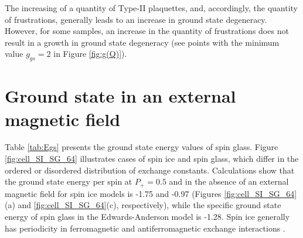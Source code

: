 \documentclass[preprint,12pt]{elsarticle}
\begin{document}
	The increasing of a quantity of Type-II plaquettes, and, accordingly, the quantity of frustrations, generally leads to an increase in ground state degeneracy. However, for some samples, an increase in the quantity of frustrations does not result in a growth in ground state degeneracy (see points with the minimum value $g_{gs}=2$ in Figure \ref{fig:g(Q)}). 
	
	\section{Ground state in an external magnetic field}
	
	Table \ref{tab:Egs} presents the ground state energy values of spin glass. Figure \ref{fig:cell_SI_SG_64} illustrates cases of spin ice and spin glass, which differ in the ordered or disordered distribution of exchange constants. Calculations show that the ground state energy per spin at $P_+ = 0.5$ and in the absence of an external magnetic field for spin ice models is -1.75 and -0.97 (Figures \ref{fig:cell_SI_SG_64}(a) and \ref{fig:cell_SI_SG_64}(c), respectively), while the specific ground state energy of spin glass in the Edwards-Anderson model is -1.28. Spin ice generally has periodicity in ferromagnetic and antiferromagnetic exchange interactions \cite{peretyatko2017interplay, otsuka2018husimi, andriushchenko2019large, shevchenko2017effect, kato2022flux}. 
	
\end{document}
